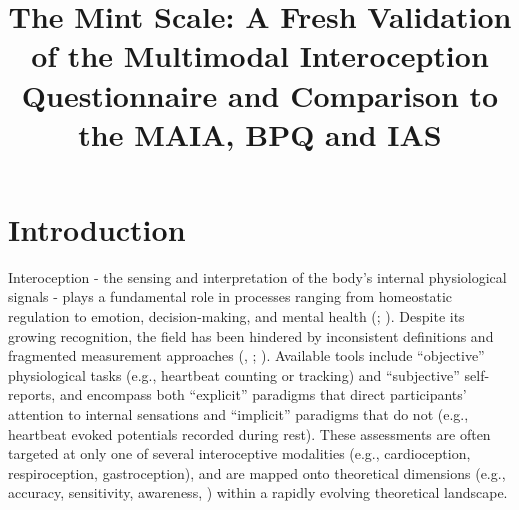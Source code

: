 \documentclass[
  man,
  floatsintext,
  longtable,
  nolmodern,
  notxfonts,
  notimes,
  mask,
  colorlinks=true,linkcolor=blue,citecolor=blue,urlcolor=blue]{apa7}
\title{\textbf{The Mint Scale: A Fresh Validation of the Multimodal
Interoception Questionnaire and Comparison to the MAIA, BPQ and IAS}}
\newlength{\cslhangindent}
\newlength{\csllabelwidth}
\begin{document}
\maketitle




\setlength\LTleft{0pt}

\resetlinenumber[1]


\ifdefined\Shaded\renewenvironment{Shaded}{\begin{snugshade}\begin{singlespace}}{\end{singlespace}\end{snugshade}}\fi


\ifdefined\cslhangindent\else\newlength{\cslhangindent}\fi
\ifdefined\csllabelwidth\else\newlength{\csllabelwidth}\fi
\setlength{\cslhangindent}{0.5in}


\section{Introduction}\label{introduction}

Interoception - the sensing and interpretation of the body's internal
physiological signals - plays a fundamental role in processes ranging
from homeostatic regulation to emotion, decision-making, and mental
health (;
). Despite its growing recognition, the field has been hindered by
inconsistent definitions and fragmented measurement approaches
(,
;
). Available
tools include ``objective'' physiological tasks (e.g., heartbeat
counting or tracking) and ``subjective'' self-reports, and encompass
both ``explicit'' paradigms that direct participants' attention to
internal sensations and ``implicit'' paradigms that do not (e.g.,
heartbeat evoked potentials recorded during rest). These assessments are
often targeted at only one of several interoceptive modalities (e.g.,
cardioception, respiroception, gastroception), and are mapped onto
theoretical dimensions (e.g., accuracy, sensitivity, awareness,
) within a
rapidly evolving theoretical landscape.
\end{document}
